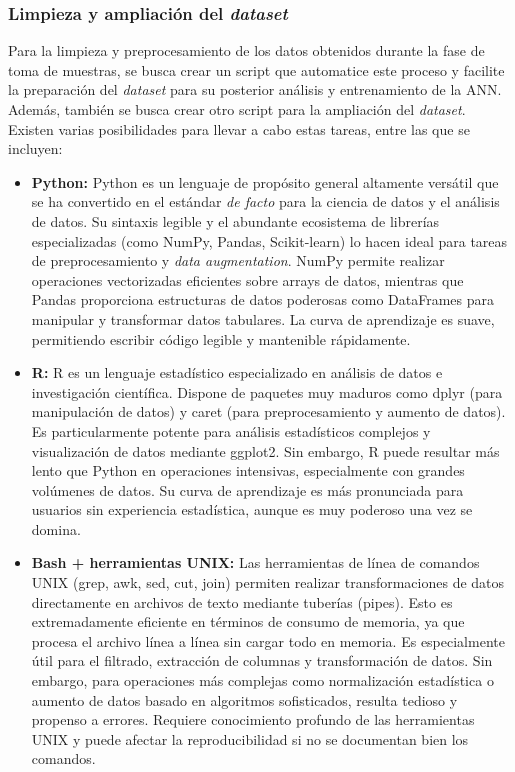 \subsubsection{Limpieza y ampliación del \textit{dataset}}
Para la limpieza y preprocesamiento de los datos obtenidos durante la fase de toma de muestras, se busca crear un script que automatice este proceso y facilite la preparación del \textit{dataset} para su posterior análisis y entrenamiento de la ANN\@. Además, también se busca crear otro script para la ampliación del \textit{dataset}. Existen varias posibilidades para llevar a cabo estas tareas, entre las que se incluyen:

\begin{itemize}
    \item \textbf{Python:} Python es un lenguaje de propósito general altamente versátil que se ha convertido en el estándar \textit{de facto} para la ciencia de datos y el análisis de datos. Su sintaxis legible y el abundante ecosistema de librerías especializadas (como NumPy, Pandas, Scikit-learn) lo hacen ideal para tareas de preprocesamiento y \textit{data augmentation}. NumPy permite realizar operaciones vectorizadas eficientes sobre arrays de datos, mientras que Pandas proporciona estructuras de datos poderosas como DataFrames para manipular y transformar datos tabulares. La curva de aprendizaje es suave, permitiendo escribir código legible y mantenible rápidamente.
    \item \textbf{R:} R es un lenguaje estadístico especializado en análisis de datos e investigación científica. Dispone de paquetes muy maduros como dplyr (para manipulación de datos) y caret (para preprocesamiento y aumento de datos). Es particularmente potente para análisis estadísticos complejos y visualización de datos mediante ggplot2. Sin embargo, R puede resultar más lento que Python en operaciones intensivas, especialmente con grandes volúmenes de datos. Su curva de aprendizaje es más pronunciada para usuarios sin experiencia estadística, aunque es muy poderoso una vez se domina.
    \item \textbf{Bash + herramientas UNIX:} Las herramientas de línea de comandos UNIX (grep, awk, sed, cut, join) permiten realizar transformaciones de datos directamente en archivos de texto mediante tuberías (pipes). Esto es extremadamente eficiente en términos de consumo de memoria, ya que procesa el archivo línea a línea sin cargar todo en memoria. Es especialmente útil para el filtrado, extracción de columnas y transformación de datos. Sin embargo, para operaciones más complejas como normalización estadística o aumento de datos basado en algoritmos sofisticados, resulta tedioso y propenso a errores. Requiere conocimiento profundo de las herramientas UNIX y puede afectar la reproducibilidad si no se documentan bien los comandos.

\end{itemize}
